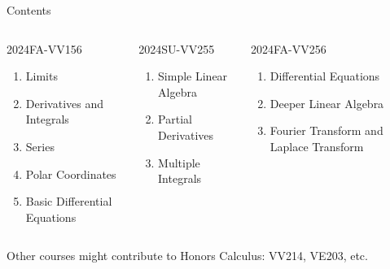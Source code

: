 \begin{frame}{Contents}
    \begin{columns}

        \begin{column}{.333\linewidth}
            \Large 2024FA-VV156
            \normalsize
            \begin{enumerate}
                \item Limits
                \item Derivatives and Integrals
                \item Series
                \item Polar Coordinates
                \item Basic Differential Equations
            \end{enumerate}
        \end{column}

        \begin{column}{.333\linewidth}
            \Large 2024SU-VV255
            \normalsize
            \begin{enumerate}
                \item Simple Linear Algebra
                \item Partial Derivatives
                \item Multiple Integrals
            \end{enumerate}
        \end{column}

        \begin{column}{.333\linewidth}
            \Large 2024FA-VV256
            \normalsize
            \begin{enumerate}
                \item Differential Equations
                \item Deeper Linear Algebra
                \item Fourier Transform and Laplace Transform

            \end{enumerate}
        \end{column}

    \end{columns}
    \vspace {1cm}
    Other courses might contribute to Honors Calculus:
    VV214, VE203, etc.

\end{frame}




